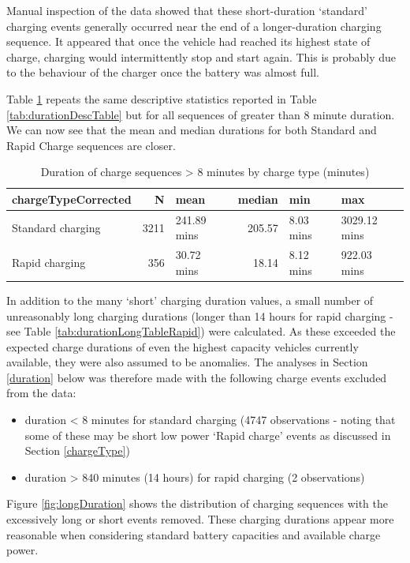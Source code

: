 \documentclass[]{article}
\providecommand{\tightlist}{%
  \setlength{\itemsep}{0pt}\setlength{\parskip}{0pt}}
\begin{document}
Manual inspection of the data showed that these short-duration `standard' charging events generally occurred near the end of a longer-duration charging sequence. It appeared that once the vehicle had reached its highest state of charge, charging would intermittently stop and start again. This is probably due to the behaviour of the charger once the battery was almost full.

Table \ref{tab:durationDescTableReduced} repeats the same descriptive statistics reported in Table \ref{tab:durationDescTable} but for all sequences of greater than 8 minute duration. We can now see that the mean and median durations for both Standard and Rapid Charge sequences are closer.

\begin{table}[t]

\caption{\label{tab:durationDescTableReduced}Duration of charge sequences > 8 minutes by charge type (minutes)}
\centering
\begin{tabular}{l|r|l|r|l|l}
\hline
chargeTypeCorrected & N & mean & median & min & max\\
\hline
Standard charging & 3211 & 241.89 mins & 205.57 & 8.03 mins & 3029.12 mins\\
\hline
Rapid charging & 356 & 30.72 mins & 18.14 & 8.12 mins & 922.03 mins\\
\hline
\end{tabular}
\end{table}

In addition to the many `short' charging duration values, a small number of unreasonably long charging durations (longer than 14 hours for rapid charging - see Table \ref{tab:durationLongTableRapid}) were calculated. As these exceeded the expected charge durations of even the highest capacity vehicles currently available, they were also assumed to be anomalies. The analyses in Section \ref{duration} below was therefore made with the following charge events excluded from the data:

\begin{itemize}
\tightlist
\item
  duration \textless{} 8 minutes for standard charging (4747 observations - noting that some of these may be short low power `Rapid charge' events as discussed in Section \ref{chargeType})
\item
  duration \textgreater{} 840 minutes (14 hours) for rapid charging (2 observations)
\end{itemize}

Figure \ref{fig:longDuration} shows the distribution of charging sequences with the excessively long or short events removed. These charging durations appear more reasonable when considering standard battery capacities and available charge power.
\end{document}
